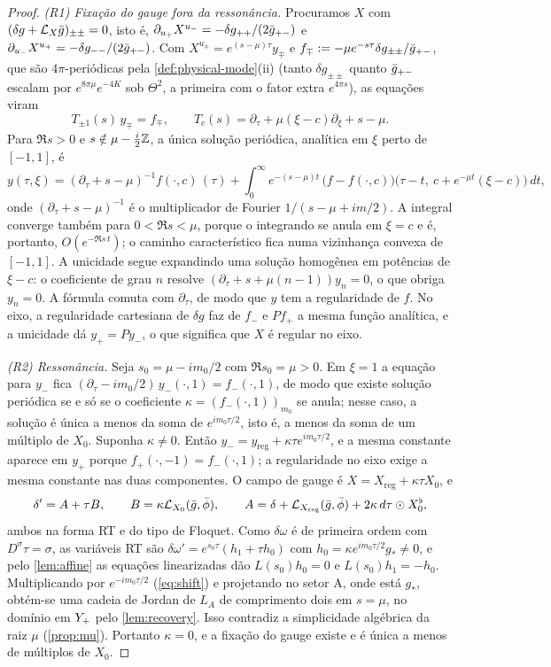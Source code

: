 \begin{proof}
\emph{(R1) Fixação do gauge fora da ressonância.} Procuramos $X$ com $(\delta g+\mathcal{L}_X\bar g)_{\pm\pm}=0$, isto
é, $\partial_{u_+}X^{u_-}=-\delta g_{++}/(2\bar g_{+-})$ e $\partial_{u_-}X^{u_+}=-\delta g_{--}/(2\bar g_{+-})$.
Com $X^{u_\mp}=e^{(s-\mu)\tau}y_\mp$ e $f_\mp:=-\mu e^{-s\tau}\delta g_{\pm\pm}/\bar g_{+-}$, que são
$4\pi$-periódicas pela \cref{def:physical-mode}(ii) (tanto $\delta g_{\pm\pm}$ quanto $\bar g_{+-}$ escalam por
$e^{8\pi\mu}e^{-4K}$ sob $\Theta^2$, a primeira com o fator extra $e^{4\pi s}$), as equações viram
\[
  T_{\pm1}(s)\,y_\mp=f_\mp,\qquad T_c(s)=\partial_\tau+\mu(\xi-c)\partial_\xi+s-\mu .
\]
Para $\Re s>0$ e $s\notin\mu-\tfrac i2\mathbb{Z}$, a única solução periódica, analítica em $\xi$ perto de $[-1,1]$,
é
\begin{equation}\label{eq:transport}
  y(\tau,\xi)=(\partial_\tau+s-\mu)^{-1}f(\cdot,c)\,(\tau)
  +\int_0^\infty e^{-(s-\mu)t}\,\big(f-f(\cdot,c)\big)\big(\tau-t,\ c+e^{-\mu t}(\xi-c)\big)\,dt,
\end{equation}
onde $(\partial_\tau+s-\mu)^{-1}$ é o multiplicador de Fourier $1/(s-\mu+im/2)$. A integral converge também
para $0<\Re s<\mu$, porque o integrando se anula em $\xi=c$ e é, portanto, $O(e^{-\Re s\,t})$; o
caminho característico fica numa vizinhança convexa de $[-1,1]$. A unicidade segue expandindo uma
solução homogênea em potências de $\xi-c$: o coeficiente de grau $n$ resolve
$(\partial_\tau+s+\mu(n-1))y_n=0$, o que obriga $y_n=0$. A fórmula comuta com $\partial_\tau$, de modo que $y$
tem a regularidade de $f$. No eixo, a regularidade cartesiana de $\delta g$ faz de $f_-$ e $Pf_+$ a
mesma função analítica, e a unicidade dá $y_+=Py_-$, o que significa que $X$ é regular no eixo.

\emph{(R2) Ressonância.} Seja $s_0=\mu-im_0/2$ com $\Re s_0=\mu>0$. Em $\xi=1$ a equação para $y_-$ fica
$(\partial_\tau-im_0/2)\,y_-(\cdot,1)=f_-(\cdot,1)$, de modo que existe solução periódica se e só se o
coeficiente $\kappa=(f_-(\cdot,1))_{m_0}$ se anula; nesse caso, a solução é única a menos da soma de
$e^{im_0\tau/2}$, isto é, a menos da soma de um múltiplo de $X_0$. Suponha $\kappa\neq0$. Então
$y_-=y_{\mathrm{reg}}+\kappa\tau e^{im_0\tau/2}$, e a mesma constante aparece em $y_+$ porque
$f_+(\cdot,-1)=f_-(\cdot,1)$; a regularidade no eixo exige a mesma constante nas duas componentes. O
campo de gauge é $X=X_{\mathrm{reg}}+\kappa\tau X_0$, e
\[
  \delta'=A+\tau B,\qquad B=\kappa\mathcal{L}_{X_0}(\bar g,\bar\phi),\qquad
  A=\delta+\mathcal{L}_{X_{\mathrm{reg}}}(\bar g,\bar\phi)+2\kappa\,d\tau\odot X_0^\flat,
\]
ambos na forma RT e do tipo de Floquet. Como $\delta\omega$ é de primeira ordem com $D^\sigma\tau=\sigma$, as variáveis
RT são $\delta\omega'=e^{s_0\tau}(h_1+\tau h_0)$ com $h_0=\kappa e^{im_0\tau/2}g_*\neq0$, e pelo
\cref{lem:affine} as equações linearizadas dão $L(s_0)h_0=0$ e $L(s_0)h_1=-h_0$. Multiplicando por
$e^{-im_0\tau/2}$ (\cref{eq:shift}) e projetando no setor A, onde está $g_*$, obtém-se uma cadeia de Jordan
de $L_A$ de comprimento dois em $s=\mu$, no domínio em $Y_{+}$ pelo \cref{lem:recovery}. Isso contradiz a
simplicidade algébrica da raiz $\mu$ (\cref{prop:mu}). Portanto $\kappa=0$, e a fixação do gauge existe e é
única a menos de múltiplos de $X_0$.


\end{proof}
